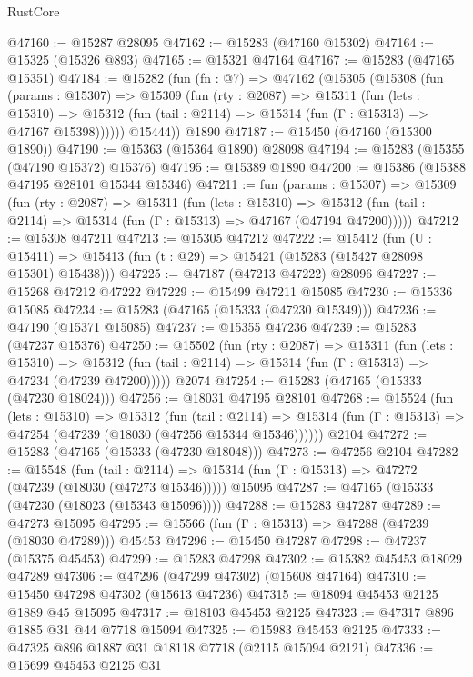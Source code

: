 \begin{lexlean}{RustCore}
\begin{coremodule}
@47160 := @15287 @28095
@47162 := @15283 (@47160 @15302)
@47164 := @15325 (@15326 @893)
@47165 := @15321 @47164
@47167 := @15283 (@47165 @15351)
@47184 := @15282
    (fun (fn : @7) =>
    @47162
      (@15305
        (@15308
          (fun (params : @15307) =>
          @15309
            (fun (rty : @2087) =>
            @15311
              (fun (lets : @15310) =>
              @15312 (fun (tail : @2114) => @15314 (fun (Γ : @15313) => @47167 @15398))))))
        @15444))
    @1890
@47187 := @15450 (@47160 (@15300 @1890))
@47190 := @15363 (@15364 @1890) @28098
@47194 := @15283 (@15355 (@47190 @15372) @15376)
@47195 := @15389 @1890
@47200 := @15386 (@15388 @47195 @28101 @15344 @15346)
@47211 := fun (params : @15307) =>
  @15309
    (fun (rty : @2087) =>
    @15311
      (fun (lets : @15310) =>
      @15312 (fun (tail : @2114) => @15314 (fun (Γ : @15313) => @47167 (@47194 @47200)))))
@47212 := @15308 @47211
@47213 := @15305 @47212
@47222 := @15412
    (fun (U : @15411) => @15413 (fun (t : @29) => @15421 (@15283 (@15427 @28098 @15301) @15438)))
@47225 := @47187 (@47213 @47222) @28096
@47227 := @15268 @47212 @47222
@47229 := @15499 @47211 @15085
@47230 := @15336 @15085
@47234 := @15283 (@47165 (@15333 (@47230 @15349)))
@47236 := @47190 (@15371 @15085)
@47237 := @15355 @47236
@47239 := @15283 (@47237 @15376)
@47250 := @15502
    (fun (rty : @2087) =>
    @15311
      (fun (lets : @15310) =>
      @15312 (fun (tail : @2114) => @15314 (fun (Γ : @15313) => @47234 (@47239 @47200)))))
    @2074
@47254 := @15283 (@47165 (@15333 (@47230 @18024)))
@47256 := @18031 @47195 @28101
@47268 := @15524
    (fun (lets : @15310) =>
    @15312
      (fun (tail : @2114) =>
      @15314 (fun (Γ : @15313) => @47254 (@47239 (@18030 (@47256 @15344 @15346))))))
    @2104
@47272 := @15283 (@47165 (@15333 (@47230 @18048)))
@47273 := @47256 @2104
@47282 := @15548
    (fun (tail : @2114) => @15314 (fun (Γ : @15313) => @47272 (@47239 (@18030 (@47273 @15346)))))
    @15095
@47287 := @47165 (@15333 (@47230 (@18023 (@15343 @15096))))
@47288 := @15283 @47287
@47289 := @47273 @15095
@47295 := @15566 (fun (Γ : @15313) => @47288 (@47239 (@18030 @47289))) @45453
@47296 := @15450 @47287
@47298 := @47237 (@15375 @45453)
@47299 := @15283 @47298
@47302 := @15382 @45453 @18029 @47289
@47306 := @47296 (@47299 @47302) (@15608 @47164)
@47310 := @15450 @47298 @47302 (@15613 @47236)
@47315 := @18094 @45453 @2125 @1889 @45 @15095
@47317 := @18103 @45453 @2125
@47323 := @47317 @896 @1885 @31 @44 @7718 @15094
@47325 := @15983 @45453 @2125
@47333 := @47325 @896 @1887 @31 @18118 @7718 (@2115 @15094 @2121)
@47336 := @15699 @45453 @2125 @31

\end{coremodule}
\end{lexlean}
